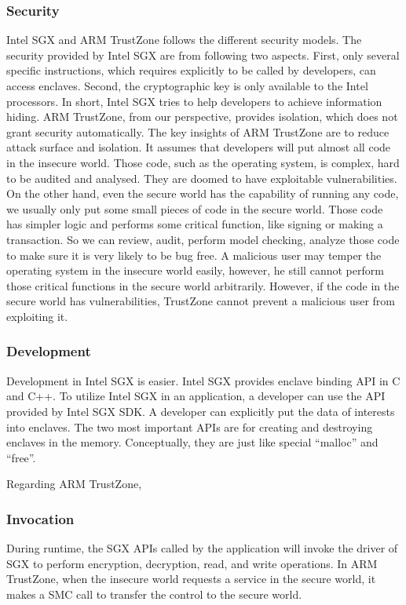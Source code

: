 \subsubsection{Security}
Intel SGX and ARM TrustZone follows the different security models.
The security provided by Intel SGX are from following two aspects.
First, only several specific instructions, which requires explicitly 
to be called by developers, can access enclaves. Second, the 
cryptographic key is only available to the Intel processors. In short,
Intel SGX tries to help developers to achieve information hiding.
ARM TrustZone, from our perspective, provides isolation, which does
not grant security automatically. The key insights of ARM TrustZone are to
reduce attack surface and isolation. It assumes that developers will 
put almost all code in the insecure world. Those code, such as the 
operating system, is complex, hard to be audited and analysed. They are 
doomed to have exploitable vulnerabilities. On the other hand, even the 
secure world has the capability of running any code, we usually only put 
some small pieces of code in the secure world. Those code has simpler 
logic and performs some critical function, like signing or making a transaction.
So we can review, audit, perform model checking, analyze those code
to make sure it is very likely to be bug free. A malicious user
may temper the operating system in the insecure world easily, however,
he still cannot perform those critical functions in the secure world 
arbitrarily. However, if the code in the secure world has vulnerabilities,
TrustZone cannot prevent a malicious user from exploiting it.             




\subsubsection{Development}
Development in Intel SGX is easier. Intel SGX provides enclave 
binding API in C and C++. To utilize Intel SGX in an application,
a developer can use the API provided by Intel SGX SDK. A developer
can explicitly put the data of interests into enclaves. 
The two most important APIs are for creating and destroying enclaves 
in the memory. Conceptually, they are just like special ``malloc''
and ``free''.     

Regarding ARM TrustZone,
  

\subsubsection{Invocation}
During runtime, the SGX APIs called by the application will invoke
the driver of SGX to perform encryption, decryption, read, and write
operations. In ARM TrustZone, when the insecure world requests a service
in the secure world, it makes a SMC call to transfer the control to
the secure world.    



